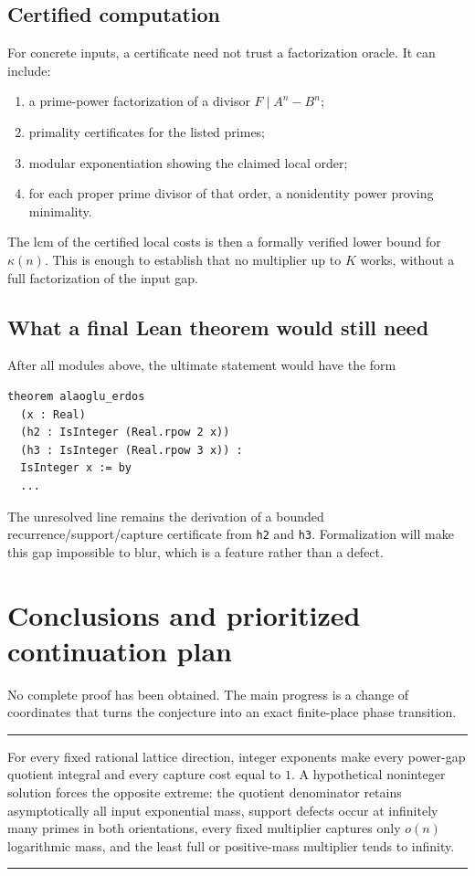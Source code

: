 \documentclass[11pt,oneside]{article}
\theoremstyle{definition}
\theoremstyle{remark}
\newenvironment{resultbox}
{\begin{center}\begin{minipage}{0.94\textwidth}\hrule\vspace{0.5em}}
{\vspace{0.45em}\hrule\end{minipage}\end{center}}
\begin{document}
\subsection{Certified computation}

For concrete inputs, a certificate need not trust a factorization oracle.  It can include:
\begin{enumerate}[label=\textup{(\roman*)}]
\item a prime-power factorization of a divisor $F\mid A^n-B^n$;
\item primality certificates for the listed primes;
\item modular exponentiation showing the claimed local order;
\item for each proper prime divisor of that order, a nonidentity power proving minimality.
\end{enumerate}
The lcm of the certified local costs is then a formally verified lower bound for
$\kappa(n)$.  This is enough to establish that no multiplier up to $K$ works, without a full
factorization of the input gap.

\subsection{What a final Lean theorem would still need}

After all modules above, the ultimate statement would have the form
\begin{lstlisting}[style=pythonstyle,language={}]
theorem alaoglu_erdos
  (x : Real)
  (h2 : IsInteger (Real.rpow 2 x))
  (h3 : IsInteger (Real.rpow 3 x)) :
  IsInteger x := by
  ...
\end{lstlisting}
The unresolved line remains the derivation of a bounded recurrence/support/capture
certificate from \texttt{h2} and \texttt{h3}.  Formalization will make this gap impossible to
blur, which is a feature rather than a defect.

\section{Conclusions and prioritized continuation plan}
\label{sec:conclusion}

No complete proof has been obtained.  The main progress is a change of coordinates that
turns the conjecture into an exact finite-place phase transition.

\begin{resultbox}
For every fixed rational lattice direction, integer exponents make every power-gap quotient
integral and every capture cost equal to $1$.  A hypothetical noninteger solution forces the
opposite extreme: the quotient denominator retains asymptotically all input exponential
mass, support defects occur at infinitely many primes in both orientations, every fixed
multiplier captures only $o(n)$ logarithmic mass, and the least full or positive-mass
multiplier tends to infinity.
\end{resultbox}
\end{document}
